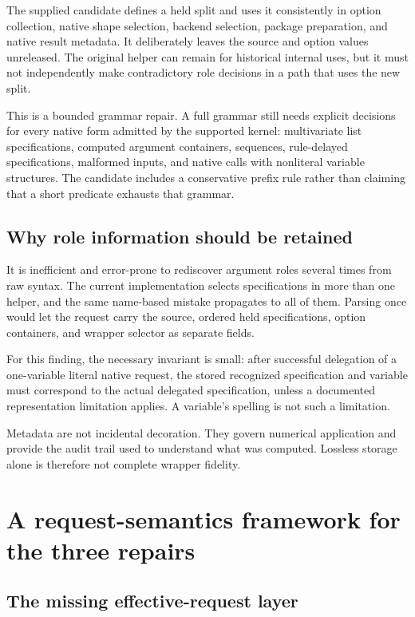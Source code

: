 \documentclass[11pt,a4paper]{article}
\newcommand{\code}[1]{\texttt{\detokenize{#1}}}
\begin{document}
The supplied candidate defines a held split and uses it consistently in option collection, native shape selection, backend selection, package preparation, and native result metadata. It deliberately leaves the source and option values unreleased. The original helper can remain for historical internal uses, but it must not independently make contradictory role decisions in a path that uses the new split.

This is a bounded grammar repair. A full grammar still needs explicit decisions for every native form admitted by the supported kernel: multivariate list specifications, computed argument containers, sequences, rule-delayed specifications, malformed inputs, and native calls with nonliteral variable structures. The candidate includes a conservative prefix rule rather than claiming that a short predicate exhausts that grammar.

\subsection{Why role information should be retained}

It is inefficient and error-prone to rediscover argument roles several times from raw syntax. The current implementation selects specifications in more than one helper, and the same name-based mistake propagates to all of them. Parsing once would let the request carry the source, ordered held specifications, option containers, and wrapper selector as separate fields.

For this finding, the necessary invariant is small: after successful delegation of a one-variable literal native request, the stored recognized specification and variable must correspond to the actual delegated specification, unless a documented representation limitation applies. A variable's spelling is not such a limitation.

Metadata are not incidental decoration. They govern numerical application and provide the audit trail used to understand what was computed. Lossless \code{"NativeResult"} storage alone is therefore not complete wrapper fidelity.

\section{A request-semantics framework for the three repairs}
\label{sec:invariants}

\subsection{The missing effective-request layer}
\end{document}
